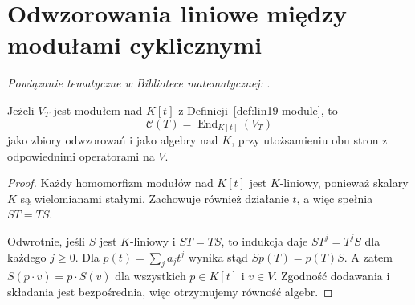 \section{Odwzorowania liniowe między modułami cyklicznymi}
\label{sec:lin21-cyclic}

\noindent\emph{Powiązanie tematyczne w Bibliotece matematycznej:} .


\begin{stwierdzenie}
\label{prop:lin21-module-endo}
Jeżeli \(V_T\) jest modułem
nad \(K[t]\) z
Definicji~\ref{def:lin19-module},
to
\[
 \mathcal C(T)
 =\operatorname{End}_{K[t]}(V_T)
\]
jako zbiory odwzorowań i jako algebry
nad \(K\), przy utożsamieniu
obu stron z odpowiednimi operatorami na \(V\).
\end{stwierdzenie}
\begin{proof}
Każdy homomorfizm modułów nad \(K[t]\)
jest \(K\)-liniowy, ponieważ
skalary \(K\) są wielomianami stałymi.
Zachowuje również działanie \(t\),
a więc spełnia \(ST=TS\).

Odwrotnie, jeśli \(S\) jest \(K\)-liniowy
i \(ST=TS\), to indukcja daje
\(ST^j=T^jS\) dla każdego \(j\ge0\).
Dla \(p(t)=\sum_j a_jt^j\)
wynika stąd
\(Sp(T)=p(T)S\).
A zatem \(S(p\cdot v)=p\cdot S(v)\)
dla wszystkich \(p\in K[t]\)
i \(v\in V\).
Zgodność dodawania i składania
jest bezpośrednia, więc otrzymujemy
równość algebr.
\end{proof}

